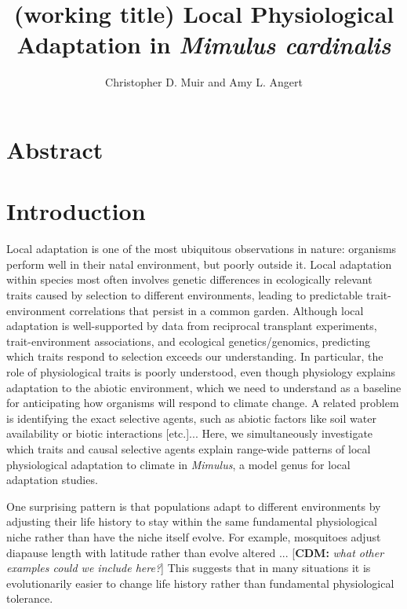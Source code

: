 \documentclass[11pt, oneside]{article}\usepackage[]{graphicx}\usepackage[]{color}
\title{(working title) Local Physiological Adaptation in \textit{Mimulus cardinalis}}
\author{Christopher D. Muir and Amy L. Angert}
\newcommand{\stretchy}{1.5}
\newcommand{\cdm}[1]{{ \color{magenta} [{\bf{CDM:}} {\em#1}]}} %
\begin{document}
\maketitle
\listoffigures
\listoftables

\section*{Abstract}

\setstretch{\stretchy}

\section*{Introduction}


Local adaptation is one of the most ubiquitous observations in nature: organisms perform well in their natal environment, but poorly outside it. Local adaptation within species most often involves genetic differences in ecologically relevant traits caused by selection to different environments, leading to predictable trait-environment correlations that persist in a common garden. Although local adaptation is well-supported by data from reciprocal transplant experiments, trait-environment associations, and ecological genetics/genomics, predicting which traits respond to selection exceeds our understanding. In particular, the role of physiological traits is poorly understood, even though physiology explains adaptation to the abiotic environment, which we need to understand as a baseline for anticipating how organisms will respond to climate change. A related problem is identifying the exact selective agents, such as abiotic factors like soil water availability or biotic interactions [etc.]... Here, we simultaneously investigate which traits and causal selective agents explain range-wide patterns of local physiological adaptation to climate in \textit{Mimulus}, a model genus for local adaptation studies.

One surprising pattern is that populations adapt to different environments by adjusting their life history to stay within the same fundamental physiological niche rather than have the niche itself evolve. For example, mosquitoes adjust diapause length with latitude rather than evolve altered ...\cdm{what other examples could we include here?} This suggests that in many situations it is evolutionarily easier to change life history rather than fundamental physiological tolerance.
\end{document}
